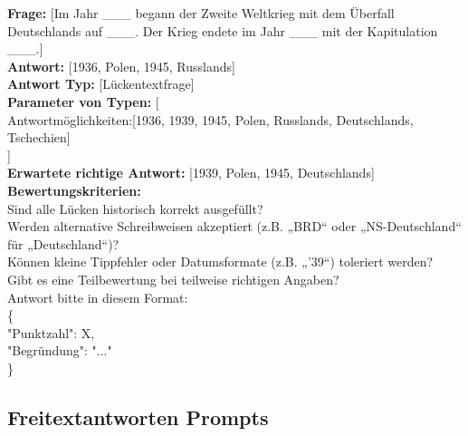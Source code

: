 \documentclass[a4paper,12pt]{article}
\begin{document}
\vspace{1em}

\textbf{Frage:} [Im Jahr \_\_\_ begann der Zweite Weltkrieg mit dem Überfall Deutschlands auf \_\_\_. Der Krieg endete im Jahr \_\_\_ mit der Kapitulation \_\_\_.] \\
\textbf{Antwort:} [1936, Polen, 1945, Russlands] \\
\textbf{Antwort Typ:} [Lückentextfrage] \\
\textbf{Parameter von Typen:} [ \\
Antwortmöglichkeiten:[1936, 1939, 1945, Polen, Russlands, Deutschlands, Tschechien] \\
] \\
\textbf{Erwartete richtige Antwort:} [1939, Polen, 1945, Deutschlands] \\
\textbf{Bewertungskriterien:} \\
Sind alle Lücken historisch korrekt ausgefüllt? \\
Werden alternative Schreibweisen akzeptiert (z.B. „BRD“ oder „NS-Deutschland“ für „Deutschland“)? \\
Können kleine Tippfehler oder Datumsformate (z.B. „'39“) toleriert werden? \\
Gibt es eine Teilbewertung bei teilweise richtigen Angaben? \\
Antwort bitte in diesem Format: \\
\{ \\
"Punktzahl": X, \\
"Begründung": "..." \\
\}

\subsection{Freitextantworten Prompts}
\end{document}
